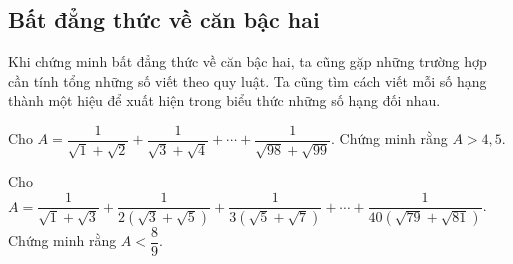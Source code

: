 \subsection{Bất đẳng thức về căn bậc hai}
Khi chứng minh bất đẳng thức về căn bậc hai, ta cũng gặp những trường hợp cần tính tổng những số viết theo quy luật. Ta cũng tìm cách viết mỗi số hạng thành một hiệu để xuất hiện trong biểu thức những số hạng đối nhau.
\begin{vd}
Cho $A=\dfrac{1}{\sqrt{1}+\sqrt{2}}+\dfrac{1}{\sqrt{3}+\sqrt{4}}+\cdots+\dfrac{1}{\sqrt{98}+\sqrt{99}}$. Chứng minh rằng $A>4{,}5$.
\end{vd}
\begin{vd}
Cho $A=\dfrac{1}{\sqrt{1}+\sqrt{3}}+\dfrac{1}{2(\sqrt{3}+\sqrt{5})}+\dfrac{1}{3(\sqrt{5}+\sqrt{7})}+\cdots+\dfrac{1}{40(\sqrt{79}+\sqrt{81})}$.\\
Chứng minh rằng $A<\dfrac{8}{9}$.
\end{vd}
